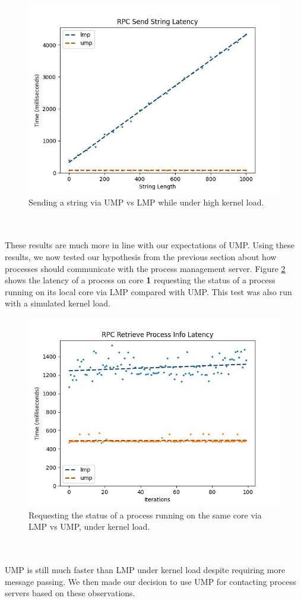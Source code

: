 \begin{figure}[ht]
    \centering
    \includegraphics[width=0.8\columnwidth]{images/send-string-kernel.jpg}
    \caption{Sending a string via UMP vs LMP while under high kernel load.}
    \label{figure:send-string-kernel}
\end{figure}
\\\\
These results are much more in line with our expectations of UMP. Using these results, we now tested our hypothesis from the previous section about how processes should communicate with the process management server. Figure \ref{figure:proc-kernel} shows the latency of a process on core \textbf{1} requesting the status of a process running on its local core via LMP compared with UMP. This test was also run with a simulated kernel load.
\begin{figure}[ht]
    \centering
    \includegraphics[width=0.8\columnwidth]{images/proc-kernel.jpg}
    \caption{Requesting the status of a process running on the same core via LMP vs UMP, under kernel load.}
    \label{figure:proc-kernel}
\end{figure}
\\\\
UMP is still much faster than LMP under kernel load despite requiring more message passing. We then made our decision to use UMP for contacting process servers based on these observations.
\clearpage
